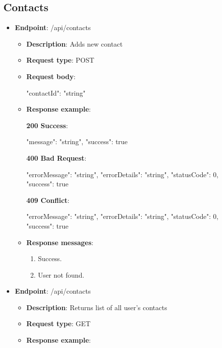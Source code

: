 \subsection{Contacts}\label{subsec:contacts}
\begin{itemize}
    \item \textbf{Endpoint}: /api/contacts
    \begin{itemize}
        \item \textbf{Description}: Adds new contact
        \item \textbf{Request type}: POST
        \item \textbf{Request body}:
        \begin{spverbatim}
        {
            "contactId": "string"
        }
        \end{spverbatim}

        \item \textbf{Response example}:

        \textbf{200 Success}:

        \begin{spverbatim}
        {
            "message": "string",
            "success": true
        }
        \end{spverbatim}

        \textbf{400 Bad Request}:

        \begin{spverbatim}
        {
            "errorMessage": "string",
            "errorDetails": "string",
            "statusCode": 0,
            "success": true
        }
        \end{spverbatim}

        \textbf{409 Conflict}:

        \begin{spverbatim}
        {
            "errorMessage": "string",
            "errorDetails": "string",
            "statusCode": 0,
            "success": true
        }
        \end{spverbatim}

        \item \textbf{Response messages}:
        \begin{enumerate}
            \item Success.
            \item User not found.
        \end{enumerate}
    \end{itemize}
    \item \textbf{Endpoint}: /api/contacts
    \begin{itemize}
        \item \textbf{Description}: Returns list of all user's contacts
        \item \textbf{Request type}: GET
        \item \textbf{Response example}:


\end{itemize}
\end{itemize}

